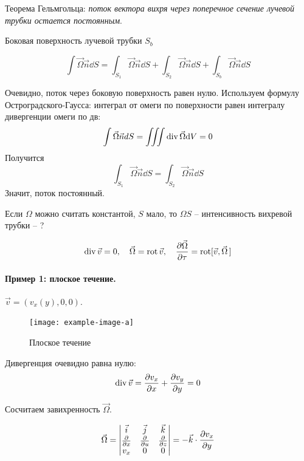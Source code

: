 Теорема Гельмгольца: \textit{поток вектора вихря через поперечное сечение лучевой трубки остается постоянным}. 

Боковая поверхность лучевой трубки $S_b$

\begin{equation}
 	\int \vec \Omega \vec{n} \dd S=\int_{S_1} \vec \Omega \vec{n} \dd S  + \int_{S_2} \vec \Omega \vec{n} \dd S + \int_{S_b} \vec \Omega \vec{n} \dd S
 \end{equation} 

Очевидно, поток через боковую поверхность равен нулю. Используем формулу Остроградского-Гаусса: интеграл от омеги по поверхности равен интегралу дивергенции омеги по дв:
\begin{equation}
	\int \vec \Omega \vec{n} dS=\iiint \operatorname{div}\vec \Omega \dd V=0
\end{equation}
Получится
\begin{equation}
	\int_{S_1} \vec \Omega \vec{n} \dd S=\int_{S_2} \vec \Omega \vec{n} \dd S
\end{equation}
Значит, поток постоянный.

Если $\Omega$ можно считать константой, $S$ мало, то $\Omega S$ -- интенсивность вихревой трубки -- ?

\begin{equation}
	\operatorname{div} \vec{v}=0, \quad
	\vec \Omega=\operatorname{rot}\vec{v}, \quad
	\pdv{\vec \Omega}{\tau}=\operatorname{rot}[\vec{v},\vec{\Omega}\,]
\end{equation}

\paragraph{Пример 1: плоское течение.} $\vec{v}=(v_x(y),0,0)$.
\begin{figure}[h!]
    \centering
    \texttt{[image: example-image-a]}
    \caption{Плоское течение}
    \label{fig:figure1}
\end{figure}
 Дивергенция очевидно равна нулю:
\begin{equation}
	\operatorname{div}\vec{v}=\pdv{v_x}{x}+\pdv{v_y}{y}=0
\end{equation}

Сосчитаем завихренность $\vec\Omega$.

\begin{equation}
	\vec{\Omega}=\mqty| %
		\vec{i}&\vec{j}&\vec{k}\\
		\pdv{x}&\pdv{u}&\pdv{z}\\
		v_x&0&0
	|=-\vec{k}\cdot\pdv{v_x}{y}
\end{equation}

